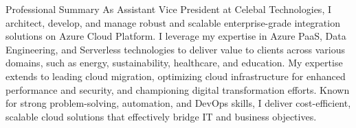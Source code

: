 \documentclass{resume} %
\begin{document}
    
    
    
    \begin{rSection}{Professional Summary}
        {As Assistant Vice President at Celebal Technologies, I architect, develop, and manage robust and scalable enterprise-grade integration solutions on Azure Cloud Platform. I leverage my expertise in Azure PaaS, Data Engineering, and Serverless technologies to deliver value to clients across various domains, such as energy, sustainability, healthcare, and education. My expertise extends to leading cloud migration, optimizing cloud infrastructure for enhanced performance and security, and championing digital transformation efforts. Known for strong problem-solving, automation, and DevOps skills, I deliver cost-efficient, scalable cloud solutions that effectively bridge IT and business objectives.}
    \end{rSection}
    
    
\end{document}
